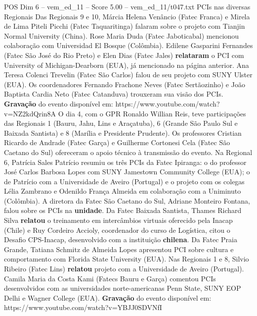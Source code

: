 \begin{textsample}{POS Dim 6 – vem\_ed\_11 – Score 5.00 – vem\_ed\_11/t047.txt}  \label{ex:f6_pos_082}
PCIs nas diversas Regionais Das Regionais 9 e 10, Márcia Helena Venâncio (Fatec Franca) e Mirela de Lima Piteli Picchi (Fatec Taquaritinga) falaram sobre o projeto com Tianjin Normal University (China).
Rose Maria Duda (Fatec Jaboticabal) mencionou colaboração com Universidad El Bosque (Colômbia).
Edilene Gasparini Fernandes (Fatec São José do Rio Preto) e Elen Dias (Fatec Jales) \textbf{relataram} o PCI com University of Michigan-Dearborn (EUA), já mencionado na página anterior.
Ana Teresa Colenci Trevelin (Fatec São Carlos) falou de seu projeto com SUNY Ulster (EUA).
Os coordenadores Fernando Frachone Neves (Fatec Sertãozinho) e João Baptista Cardia Neto (Fatec Catanduva) trouxeram sua visão dos PCIs. \textbf{Gravação} do evento disponível em: https://www.youtube.com/watch?v=NZ2kdQrin8A O dia 4, com o GPR Ronaldo Willian Reis, teve participações das Regionais 1 (Bauru, Jahu, Lins e Araçatuba), 6 (Grande São Paulo Sul e Baixada Santista) e 8 (Marília e Presidente Prudente).
Os professores Cristian Ricardo de Andrade (Fatec Garça) e Guilherme Cortonesi Cela (Fatec São Caetano do Sul) ofereceram o apoio técnico à transmissão do evento.
Na Regional 6, Patrícia Sales Patrício resumiu os três PCIs da Fatec Ipiranga: o do professor José Carlos Barbosa Lopes com SUNY Jamestown Community College (EUA); o de Patrício com a Universidade de Aveiro (Portugal) e o projeto com os colegas Lélia Zambrano e Odenildo França Almeida em colaboração com a Uniminuto (Colômbia).
A diretora da Fatec São Caetano do Sul, Adriane Monteiro Fontana, falou sobre os PCIs na \textbf{unidade}.
Da Fatec Baixada Santista, Thames Richard Silva \textbf{relatou} o treinamento em intercâmbios virtuais oferecido pela Inacap (Chile) e Ruy Cordeiro Accioly, coordenador do curso de Logística, citou o Desafio CPS-Inacap, desenvolvido com a instituição \textbf{chilena}.
Da Fatec Praia Grande, Tatiana Schmitz de Almeida Lopes apresentou PCI sobre cultura e comportamento com Florida State University (EUA).
Nas Regionais 1 e 8, Silvio Ribeiro (Fatec Lins) \textbf{relatou} projeto com a Universidade de Aveiro (Portugal).
Camila Maria da Costa Kami (Fatecs Bauru e Garça) comentou PCIs desenvolvidos com as universidades norte-americanas Penn State, SUNY EOP Delhi e Wagner College (EUA). \textbf{Gravação} do evento disponível em: https://www.youtube.com/watch?v=YBJJ0SDVNfI

\end{textsample}
